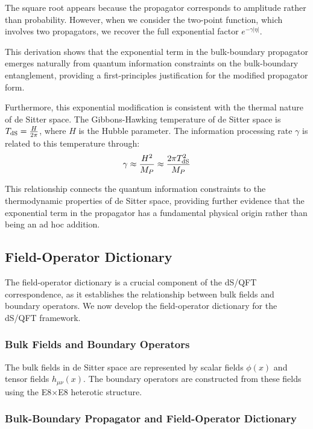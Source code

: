 \documentclass[11pt,english,twoside]{article}
\theoremstyle{plain}
\theoremstyle{definition}
\theoremstyle{remark}
\newcommand{\dS}{{\rm dS}}
\newcommand{\gammaR}{\gamma}
\begin{document}
The square root appears because the propagator corresponds to amplitude rather than probability. However, when we consider the two-point function, which involves two propagators, we recover the full exponential factor $e^{-\gammaR|\eta|}$.

This derivation shows that the exponential term in the bulk-boundary propagator emerges naturally from quantum information constraints on the bulk-boundary entanglement, providing a first-principles justification for the modified propagator form.

Furthermore, this exponential modification is consistent with the thermal nature of de Sitter space. The Gibbons-Hawking temperature of de Sitter space is $T_{\dS} = \frac{H}{2\pi}$, where $H$ is the Hubble parameter. The information processing rate $\gammaR$ is related to this temperature through:
\begin{equation}
\gammaR \approx \frac{H^2}{M_P} \approx \frac{2\pi T_{\dS}^2}{M_P}
\end{equation}

This relationship connects the quantum information constraints to the thermodynamic properties of de Sitter space, providing further evidence that the exponential term in the propagator has a fundamental physical origin rather than being an ad hoc addition.

\subsection{Field-Operator Dictionary}

The field-operator dictionary is a crucial component of the dS/QFT correspondence, as it establishes the relationship between bulk fields and boundary operators. We now develop the field-operator dictionary for the dS/QFT framework.

\subsubsection{Bulk Fields and Boundary Operators}

The bulk fields in de Sitter space are represented by scalar fields $\phi(x)$ and tensor fields $h_{\mu\nu}(x)$. The boundary operators are constructed from these fields using the E8$\times$E8 heterotic structure.

\subsubsection{Bulk-Boundary Propagator and Field-Operator Dictionary}
\end{document}
